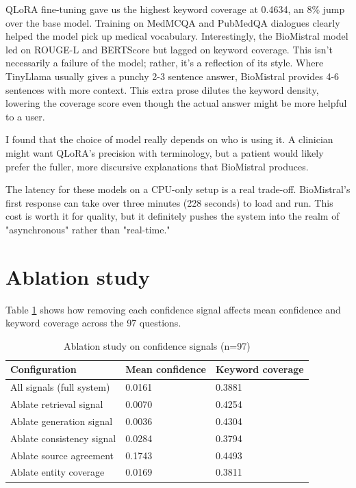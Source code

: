 QLoRA fine-tuning gave us the highest keyword coverage at 0.4634, an 8\% jump over the base model. Training on MedMCQA and PubMedQA dialogues clearly helped the model pick up medical vocabulary. Interestingly, the BioMistral model led on ROUGE-L and BERTScore but lagged on keyword coverage. This isn't necessarily a failure of the model; rather, it’s a reflection of its style. Where TinyLlama usually gives a punchy 2-3 sentence answer, BioMistral provides 4-6 sentences with more context. This extra prose dilutes the keyword density, lowering the coverage score even though the actual answer might be more helpful to a user.

I found that the choice of model really depends on who is using it. A clinician might want QLoRA’s precision with terminology, but a patient would likely prefer the fuller, more discursive explanations that BioMistral produces. 

The latency for these models on a CPU-only setup is a real trade-off. BioMistral's first response can take over three minutes (228 seconds) to load and run. This cost is worth it for quality, but it definitely pushes the system into the realm of "asynchronous" rather than "real-time."

\section{Ablation study}

Table \ref{tab:ablation} shows how removing each confidence signal affects mean confidence and keyword coverage across the 97 questions.

\begin{table}[htbp]
\centering
\caption{Ablation study on confidence signals (n=97)}
\label{tab:ablation}
\renewcommand{\arraystretch}{1.3}
\begin{tabular}{|l|l|l|}
\hline
\textbf{Configuration} & \textbf{Mean confidence} & \textbf{Keyword coverage} \\
\hline
All signals (full system) & 0.0161 & 0.3881 \\
Ablate retrieval signal & 0.0070 & 0.4254 \\
Ablate generation signal & 0.0036 & 0.4304 \\
Ablate consistency signal & 0.0284 & 0.3794 \\
Ablate source agreement & 0.1743 & 0.4493 \\
Ablate entity coverage & 0.0169 & 0.3811 \\
\hline
\end{tabular}
\end{table}


